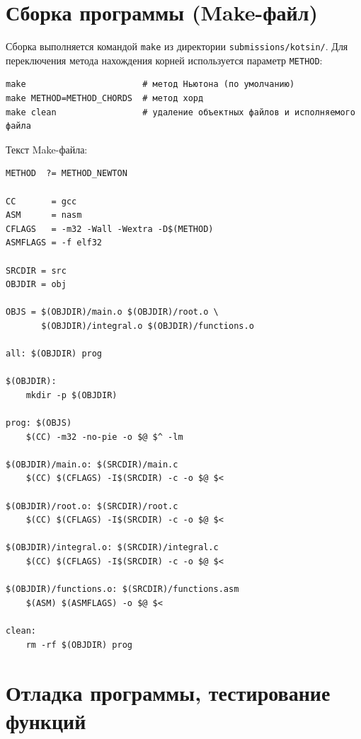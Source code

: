 \documentclass[a4paper,12pt,titlepage,finall]{article}
\begin{document}
\newpage

\section{Сборка программы (Make-файл)}

Сборка выполняется командой \texttt{make} из директории \texttt{submissions/kotsin/}.
Для переключения метода нахождения корней используется параметр \texttt{METHOD}:

\begin{lstlisting}
make                       # метод Ньютона (по умолчанию)
make METHOD=METHOD_CHORDS  # метод хорд
make clean                 # удаление объектных файлов и исполняемого файла
\end{lstlisting}

\noindent Текст Make-файла:

\begin{lstlisting}
METHOD  ?= METHOD_NEWTON

CC       = gcc
ASM      = nasm
CFLAGS   = -m32 -Wall -Wextra -D$(METHOD)
ASMFLAGS = -f elf32

SRCDIR = src
OBJDIR = obj

OBJS = $(OBJDIR)/main.o $(OBJDIR)/root.o \
       $(OBJDIR)/integral.o $(OBJDIR)/functions.o

all: $(OBJDIR) prog

$(OBJDIR):
	mkdir -p $(OBJDIR)

prog: $(OBJS)
	$(CC) -m32 -no-pie -o $@ $^ -lm

$(OBJDIR)/main.o: $(SRCDIR)/main.c
	$(CC) $(CFLAGS) -I$(SRCDIR) -c -o $@ $<

$(OBJDIR)/root.o: $(SRCDIR)/root.c
	$(CC) $(CFLAGS) -I$(SRCDIR) -c -o $@ $<

$(OBJDIR)/integral.o: $(SRCDIR)/integral.c
	$(CC) $(CFLAGS) -I$(SRCDIR) -c -o $@ $<

$(OBJDIR)/functions.o: $(SRCDIR)/functions.asm
	$(ASM) $(ASMFLAGS) -o $@ $<

clean:
	rm -rf $(OBJDIR) prog
\end{lstlisting}

\newpage

\section{Отладка программы, тестирование функций}
\end{document}
